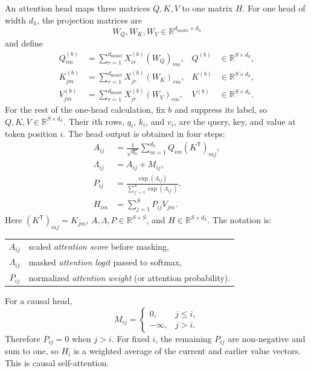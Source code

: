 \documentclass[11pt]{article}
\newcommand{\R}{\mathbb{R}}
\begin{document}
An attention head maps three matrices $Q,K,V$ to one matrix $H$.  For one head
of width $d_h$, the projection matrices are
\[
  W_Q,W_K,W_V\in\R^{d_{\mathrm{model}}\times d_h}
\]
and define
\begin{align}
  Q_{im}^{(b)}
  &=\sum_{r=1}^{d_{\mathrm{model}}}X_{ir}^{(b)}(W_Q)_{rm},
  &Q^{(b)}&\in\R^{S\times d_h},\\
  K_{jm}^{(b)}
  &=\sum_{r=1}^{d_{\mathrm{model}}}X_{jr}^{(b)}(W_K)_{rm},
  &K^{(b)}&\in\R^{S\times d_h},\\
  V_{jm}^{(b)}
  &=\sum_{r=1}^{d_{\mathrm{model}}}X_{jr}^{(b)}(W_V)_{rm},
  &V^{(b)}&\in\R^{S\times d_h}.
\end{align}
\clearpage
For the rest of the one-head calculation, fix $b$ and suppress its label, so
$Q,K,V\in\R^{S\times d_h}$.
Their $i$th rows, $q_i$, $k_i$, and $v_i$, are the query, key, and value at
token position $i$.  The head output is obtained in four steps:
\begin{align}
  A_{ij}
  &=\frac{1}{\sqrt{d_h}}
    \sum_{m=1}^{d_h}Q_{im}(K^{\mathsf T})_{mj},
  \label{eq:one-head-score}\\
  \Lambda_{ij}
  &=A_{ij}+M_{ij},
  \label{eq:one-head-logit}\\
  P_{ij}
  &=\frac{\exp(\Lambda_{ij})}
    {\sum_{j'=1}^{S}\exp(\Lambda_{ij'})},
  \label{eq:one-head-probability}\\
  H_{im}
  &=\sum_{j=1}^{S}P_{ij}V_{jm}.
  \label{eq:one-head-output}
\end{align}
Here $(K^{\mathsf T})_{mj}=K_{jm}$,
$A,\Lambda,P\in\R^{S\times S}$, and $H\in\R^{S\times d_h}$.  The notation is:
\begin{center}
\small
\begin{tabular}{@{}c l@{}}
$A_{ij}$ & scaled \emph{attention score} before masking, \\
$\Lambda_{ij}$ & masked \emph{attention logit} passed to softmax, \\
$P_{ij}$ & normalized \emph{attention weight} (or attention probability). \\
\end{tabular}
\end{center}
For a causal head,
\[
  M_{ij}=\begin{cases}
    0, & j\le i,\\
    -\infty, & j>i.
  \end{cases}
\]
Therefore $P_{ij}=0$ when $j>i$.  For fixed $i$, the remaining $P_{ij}$ are
non-negative and sum to one, so $H_i$ is a weighted average of the current and
earlier value vectors.  This is causal self-attention.
\end{document}

